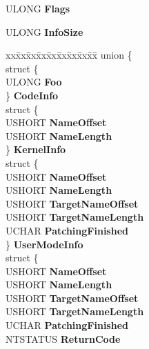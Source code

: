 \begin{DoxyCompactItemize}
\item 
\mbox{\label{struct___s_y_s_t_e_m___h_o_t_p_a_t_c_h___c_o_d_e___i_n_f_o_r_m_a_t_i_o_n_a919ce839eb04b28f8e5370e3f345fb36}} 
U\+L\+O\+NG {\bfseries Flags}
\item 
\mbox{\label{struct___s_y_s_t_e_m___h_o_t_p_a_t_c_h___c_o_d_e___i_n_f_o_r_m_a_t_i_o_n_a49609e92fa440e7a64cec81f4e18eebe}} 
U\+L\+O\+NG {\bfseries Info\+Size}
\item 
\mbox{\label{struct___s_y_s_t_e_m___h_o_t_p_a_t_c_h___c_o_d_e___i_n_f_o_r_m_a_t_i_o_n_acbace11b7d4cef807eb43a9c499a7477}} 
\begin{tabbing}
xx\=xx\=xx\=xx\=xx\=xx\=xx\=xx\=xx\=\kill
union \{\\
\>struct \{\\
\>\>ULONG {\bfseries Foo}\\
\>\} {\bfseries CodeInfo}\\
\>struct \{\\
\>\>USHORT {\bfseries NameOffset}\\
\>\>USHORT {\bfseries NameLength}\\
\>\} {\bfseries KernelInfo}\\
\>struct \{\\
\>\>USHORT {\bfseries NameOffset}\\
\>\>USHORT {\bfseries NameLength}\\
\>\>USHORT {\bfseries TargetNameOffset}\\
\>\>USHORT {\bfseries TargetNameLength}\\
\>\>UCHAR {\bfseries PatchingFinished}\\
\>\} {\bfseries UserModeInfo}\\
\>struct \{\\
\>\>USHORT {\bfseries NameOffset}\\
\>\>USHORT {\bfseries NameLength}\\
\>\>USHORT {\bfseries TargetNameOffset}\\
\>\>USHORT {\bfseries TargetNameLength}\\
\>\>UCHAR {\bfseries PatchingFinished}\\
\>\>NTSTATUS {\bfseries ReturnCode}\\

\end{tabbing}
\end{DoxyCompactItemize}
